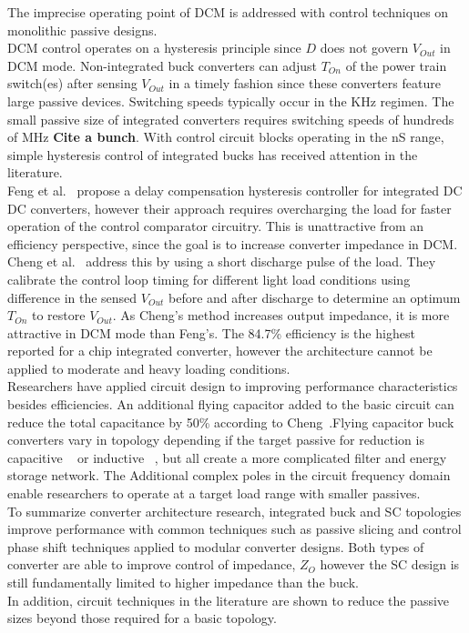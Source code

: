 \documentclass[letterpaper,twocolumn,10pt]{article}
\begin{document}
The imprecise operating point of DCM is addressed with control techniques on monolithic passive designs.\\
DCM control operates on a hysteresis principle since $D$ does not govern $V_{Out}$ in DCM mode. Non-integrated buck converters can adjust $T_{On}$ of the power train switch(es) after sensing $V_{Out}$ in a timely fashion since these converters feature large passive devices. Switching speeds typically occur in the KHz regimen. The small passive size of integrated converters requires switching speeds of hundreds of MHz \textbf{Cite a bunch}. With control circuit blocks operating in the nS range, simple hysteresis control of integrated bucks has received attention in the literature.\\
Feng et al.~\cite{Feng2008} propose a delay compensation hysteresis controller for integrated DC DC converters, however their approach requires overcharging the load for faster operation of the control comparator circuitry. This is unattractive from an efficiency perspective, since the goal is to increase converter impedance in DCM. Cheng et al. ~\cite{Cheng2013}address this by using a short discharge pulse of the load. They calibrate the control loop timing for different light load conditions using difference in the sensed $V_{Out}$ before and after discharge to determine an optimum $T_{On}$ to restore $V_{Out}$. As Cheng's method increases output impedance, it is more attractive in DCM mode than Feng's. The 84.7\% efficiency is the highest reported for a chip integrated converter, however the architecture cannot be applied to moderate and heavy loading conditions.\\  
\indent Researchers have applied circuit design to improving performance characteristics besides efficiencies. An additional flying capacitor added to the basic circuit can reduce the total capacitance by 50\% according to Cheng~\cite{ChengII2013}.Flying capacitor buck converters vary in topology depending if the target passive for reduction is capacitive ~\cite{ChengII2013} or inductive ~\cite{Kim2011}, but all create a more complicated filter and energy storage network. The Additional complex poles in the circuit frequency domain enable researchers to operate at a target load range with smaller passives.\\

To summarize converter architecture research, integrated buck and SC topologies improve performance with common techniques such as passive slicing and control phase shift techniques applied to modular converter designs. Both types of converter are able to improve control of impedance, $Z_O$ however the SC design is still fundamentally limited to higher impedance than the buck.\\
In addition, circuit techniques in the literature are shown to reduce the passive sizes beyond those required for a basic topology.\\  
 
\end{document}
